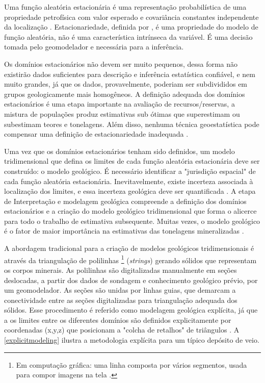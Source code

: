 Uma função aleatória estacionária é uma representação probabilística de uma propriedade petrofísica com valor esperado e covariância constantes independente da localização \cite{mclennanstationarity}. Estacionariedade, definida por , é uma propriedade do modelo de função aleatória, não é uma característica intrínseca da variável. É uma decisão tomada pelo geomodelador e necessária para a inferência.

Os domínios estacionários não devem ser muito pequenos, dessa forma não existirão dados suficientes para descrição e inferência estatística confiável, e nem muito grandes, já que os dados, provavelmente, poderiam ser subdivididos em grupos geologicamente mais homogêneos. A definição adequada dos domínios estacionários é uma etapa importante na avaliação de recursos/reservas, a mistura de populações produz estimativas sub ótimas que superestimam ou subestimam teores e tonelagens. Além disso, nenhuma técnica geoestatística pode compensar uma definição de estacionariedade inadequada \cite{rossi2013mineral}.

Uma vez que os domínios estacionários tenham sido definidos, um modelo tridimensional que defina os limites de cada função aleatória estacionária deve ser construído: o modelo geológico. É necessário identificar a "jurisdição espacial" de cada função aleatória estacionária. Inevitavelmente, existe incerteza associada à localização dos limites, e essa incerteza geológica deve ser quantificada \cite{mclennanstationarity}. A etapa de Interpretação e modelagem geológica compreende a definição dos domínios estacionários e a criação do modelo geológico tridimensional que forma o alicerce para todo o trabalho de estimativa subsequente. Muitas vezes, o modelo geológico é o fator de maior importância na estimativas das tonelagens mineralizadas \cite{rossi2013mineral}.

A abordagem tradicional para a criação de modelos geológicos tridimensionais é através da triangulação de polilinhas \footnote{Em computação gráfica: uma linha composta por vários segmentos, usada para compor imagens na tela \cite{oxfordonlinedictionary}.} (\textit{strings}) gerando sólidos que representam os corpos minerais. As polilinhas são digitalizadas manualmente em seções deslocadas, a partir dos dados de sondagem e conhecimento geológico prévio, por um geomodelador. As seções são unidas por linhas guias, que demarcam a conectividade entre as seções digitalizadas para triangulação adequada dos sólidos. Esse procedimento é referido como modelagem geológica explícita, já que a os limites entre os diferentes domínios são definidos explicitamente por coordenadas (x,y,z) que posicionam a "colcha de retalhos" de triângulos \cite{mclennan2006boundsim,cowan2003practical}. A \autoref{explicitmodeling} ilustra a metodologia explícita para um típico depósito de veio.

